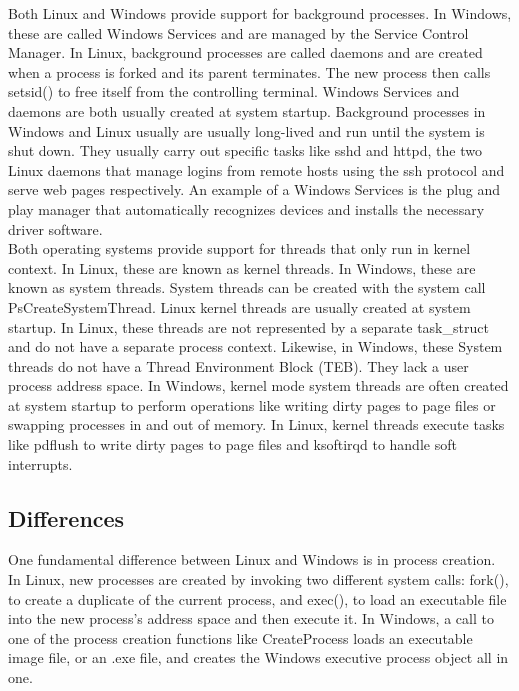 \documentclass[letterpaper,10pt,titlepage]{article}
\begin{document}
\linebreak
Both Linux and Windows provide support for background processes. In Windows,
these are called Windows Services and are managed by the Service Control 
Manager. In Linux, background processes are called daemons and are created 
when a process is forked and its parent terminates. The new process then calls
setsid() to free itself from the controlling terminal. Windows Services and 
daemons are both usually created at system startup. Background processes in
Windows and Linux usually are usually long-lived and run until the system 
is shut down. They usually carry out specific tasks like sshd and httpd, the
two Linux daemons that manage logins from remote hosts using the ssh protocol
and serve web pages respectively. An example of a Windows Services is 
the plug and play manager that automatically recognizes devices and installs
the necessary driver software.
\\
\linebreak
Both operating systems provide support for threads that only run in kernel 
context. In Linux, these are known as kernel threads. In Windows, these are 
known as system threads. System threads can be created with the system call
PsCreateSystemThread. Linux kernel threads are usually created at system 
startup. In Linux, these threads are not represented by a separate task\_struct
and do not have a separate process context. Likewise, in Windows, these
System threads do not have a Thread Environment Block (TEB). They lack a user
process address space. In Windows, kernel mode system threads are often 
created at system startup to perform operations like writing dirty pages to
page files or swapping processes in and out of memory. In Linux, kernel 
threads execute tasks like pdflush to write dirty pages to page files and 
ksoftirqd to handle soft interrupts.
\subsection{Differences}

One fundamental difference between Linux and Windows is in process creation. 
In Linux, new processes are created by invoking two different system calls:
fork(), to create a duplicate of the current process, and exec(), to load an
executable file into the new process's address space and then execute it. 
In Windows, a call to one of the process creation functions like CreateProcess
loads an executable image file, or an .exe file, and creates the Windows
executive process object all in one.
\\
\end{document}
